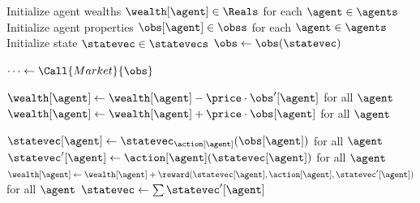 \begin{definition}
\begin{algorithm}[tb]
\begin{algorithmic}
\State Initialize agent wealths $\wealth [\agent]\in\Reals$ for each $\agent\in\agents$
\State Initialize agent properties $\obs[\agent]\in\obss$ for each $\agent\in\agents$
\State Initialize state $\statevec\in\statevecs$
\State $\obs\gets\obs(\statevec)$

\State $\dots\gets\Call{Market}{\obs}$

\State $\wealth[\agent]\gets\wealth[\agent]-\price\cdot\obs'[\agent]$ for all $\agent$
\State $\wealth[\agent]\gets\wealth[\agent]+\price\cdot\obs[\agent]$ for all $\agent$


\State $\statevec[\agent]\gets\statevec_{\action[\agent]}(\obs[\agent])$ for all $\agent$
\State $\statevec'[\agent]\gets\action[\agent](\statevec[\agent])$ for all $\agent$
\State $\wealth[\agent]\gets\wealth[\agent]+\reward(\statevec[\agent], \action[\agent], \statevec'[\agent])$ for all $\agent$
\State $\statevec\gets\sum\statevec'[\agent]$ 
\EndWhile
\EndProcedure



\end{algorithmic}
\end{algorithm}

\label{mba:def:goods}
\end{definition}

